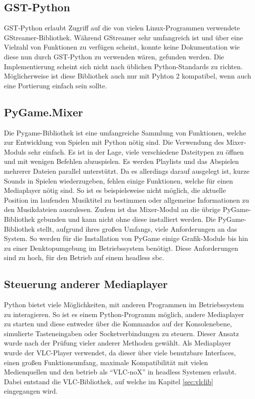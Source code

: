 \documentclass[12pt,a4paper,hidelinks]{scrreprt}
\begin{document}
\subsection{GST-Python}\label{ssec:gst-python}
	GST-Python erlaubt Zugriff auf die von vielen Linux-Programmen verwendete GStreamer-Bibliothek. Während GStreamer sehr umfangreich ist und über eine Vielzahl von Funktionen zu verfügen scheint, konnte keine Dokumentation wie diese nun durch GST-Python zu verwenden wären, gefunden werden. Die Implementierung scheint sich nicht nach üblichen Python-Standards zu richten. Möglicherweise ist diese Bibliothek auch nur mit Pyhton 2 kompatibel, wenn auch eine Portierung einfach sein sollte.
	
\subsection{PyGame.Mixer}
	Die Pygame-Bibliothek ist eine umfangreiche Sammlung von Funktionen, welche zur Entwicklung von Spielen mit Python nötig sind. Die Verwendung des Mixer-Moduls sehr einfach. Es ist in der Lage, viele verschiedene Dateitypen zu öffnen und mit wenigen Befehlen abzuspielen. Es werden Playlists und das Abspielen mehrerer Dateien parallel unterstützt. Da es allerdings darauf ausgelegt ist, kurze Sounds in Spielen wiederzugeben, fehlen einige Funktionen, welche für einen Mediaplayer nötig sind. So ist es beispielsweise nicht möglich, die aktuelle Position im laufenden Musiktitel zu bestimmen oder allgemeine Informationen zu den Musikdateien auszulesen. Zudem ist das Mixer-Modul an die übrige PyGame-Bibliothek gebunden und kann nicht ohne diese installiert werden. Die PyGame-Bibliothek stellt, aufgrund ihres großen Umfangs, viele Anforderungen an das System. So werden für die Installation von PyGame einige Grafik-Module bis hin zu einer Denktopumgebung im Betriebssystem benötigt. Diese Anforderungen sind zu hoch, für den Betrieb auf einem \gls{headless} \gls{sbc}. \cite{pygamemixer}
	
\subsection{Steuerung anderer Mediaplayer}
	Python bietet viele Möglichkeiten, mit anderen Programmen im Betriebssystem zu interagieren. 
	So ist es einem Python-Programm möglich, andere Mediaplayer zu starten und diese entweder über die Kommandos auf der Konsolenebene, simulierte Tasteneingaben oder Socketverbindungen zu steuern.
	Dieser Ansatz wurde nach der Prüfung vieler anderer Methoden gewählt.
	Als Mediaplayer wurde der VLC-Player verwendet, da dieser über viele benutzbare Interfaces, einen großen Funktionsumfang, maximale Kompatibilität mit vielen Medienquellen und den betrieb als \enquote{VLC-noX} in \gls{headless} Systemen erlaubt. \cite{vlc-nox}
	Dabei entstand die VLC-Bibliothek, auf welche im Kapitel \ref{sec:vlclib} eingegangen wird. 
	
\end{document}
